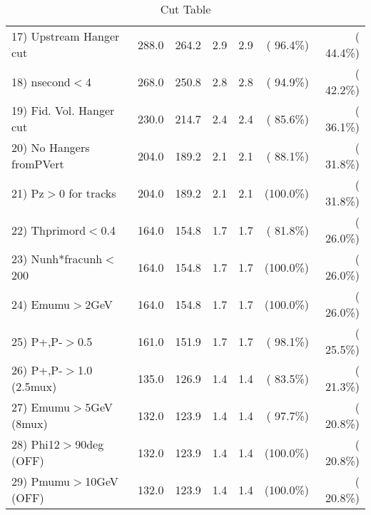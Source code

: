 \begin{table}[h!]
\begin{tabular}{||l||r|r|r|r|r|r||}
 17) Upstream Hanger cut  &        288.0 &        264.2 &          2.9 &          2.9 & ( 96.4\%) & ( 44.4\%) \\
 18) nsecond$<$4          &        268.0 &        250.8 &          2.8 &          2.8 & ( 94.9\%) & ( 42.2\%) \\
 19) Fid. Vol. Hanger cut &        230.0 &        214.7 &          2.4 &          2.4 & ( 85.6\%) & ( 36.1\%) \\
 20) No Hangers fromPVert &        204.0 &        189.2 &          2.1 &          2.1 & ( 88.1\%) & ( 31.8\%) \\
 21) Pz$>$0 for tracks    &        204.0 &        189.2 &          2.1 &          2.1 & (100.0\%) & ( 31.8\%) \\
 22) Thprimord$<$0.4      &        164.0 &        154.8 &          1.7 &          1.7 & ( 81.8\%) & ( 26.0\%) \\
 23) Nunh*fracunh$<$200   &        164.0 &        154.8 &          1.7 &          1.7 & (100.0\%) & ( 26.0\%) \\
 24) Emumu$>$2GeV         &        164.0 &        154.8 &          1.7 &          1.7 & (100.0\%) & ( 26.0\%) \\
 25) P+,P-$>$0.5          &        161.0 &        151.9 &          1.7 &          1.7 & ( 98.1\%) & ( 25.5\%) \\
 26) P+,P-$>$1.0 (2.5mux) &        135.0 &        126.9 &          1.4 &          1.4 & ( 83.5\%) & ( 21.3\%) \\
 27) Emumu$>$5GeV  (8mux) &        132.0 &        123.9 &          1.4 &          1.4 & ( 97.7\%) & ( 20.8\%) \\
 28) Phi12$>$90deg  (OFF) &        132.0 &        123.9 &          1.4 &          1.4 & (100.0\%) & ( 20.8\%) \\
 29) Pmumu$>$10GeV  (OFF) &        132.0 &        123.9 &          1.4 &          1.4 & (100.0\%) & ( 20.8\%) \\
 \hline
 \hline
 \end{tabular}
 \caption{Cut Table           }
 \label{tab-cutcohjpsi-mumu_anuecc}
 \end{table}
